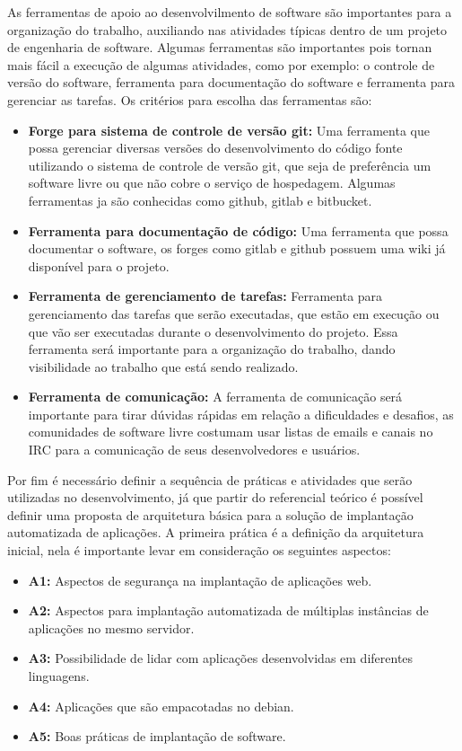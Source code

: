 
As ferramentas de apoio ao desenvolvilmento de software são importantes para a
organização do trabalho, auxiliando nas atividades típicas dentro de um projeto
de engenharia de software. Algumas ferramentas são importantes pois tornan mais fácil
a execução de algumas atividades, como por exemplo: o controle de versão do software,
ferramenta para documentação do software e ferramenta para gerenciar as tarefas.
Os critérios para escolha das ferramentas são:

\begin{itemize}
  \item \textbf{Forge para sistema de controle de versão git:} Uma ferramenta que
  possa gerenciar diversas versões do desenvolvimento do código fonte utilizando
  o sistema de controle de versão git, que seja de preferência um software livre
  ou que não cobre o serviço de hospedagem. Algumas ferramentas ja são
  conhecidas como github, gitlab e bitbucket.
  \item \textbf{Ferramenta para documentação de código:} Uma ferramenta que possa
  documentar o software, os forges como gitlab e github possuem uma wiki já disponível
  para o projeto.
  \item \textbf{Ferramenta de gerenciamento de tarefas:} Ferramenta para gerenciamento
  das tarefas que serão executadas, que estão em execução ou que vão ser executadas
  durante o desenvolvimento do projeto. Essa ferramenta será importante para a
  organização do trabalho, dando visibilidade ao trabalho que está sendo realizado.
  \item \textbf{Ferramenta de comunicação:} A ferramenta de comunicação será
  importante para tirar dúvidas rápidas em relação a dificuldades e desafios, as
  comunidades de software livre costumam usar listas de emails e canais no IRC
  para a comunicação de seus desenvolvedores e usuários.
\end{itemize}


Por fim é necessário definir a  sequência de práticas  e atividades que serão
utilizadas no desenvolvimento, já que partir do referencial teórico é possível
definir uma proposta de arquitetura básica para a solução de implantação automatizada
de aplicações. A primeira prática é a definição da arquitetura inicial, nela é importante levar em consideração os
seguintes aspectos:

\begin{itemize}
  \item  \textbf{A1:} Aspectos de segurança na implantação de aplicações web.
  \item  \textbf{A2:} Aspectos para implantação automatizada de múltiplas instâncias de
   aplicações no mesmo servidor.
  \item  \textbf{A3:} Possibilidade de lidar com aplicações desenvolvidas em
  diferentes linguagens.
  \item  \textbf{A4:} Aplicações que são empacotadas no debian.
  \item  \textbf{A5:} Boas práticas de implantação de software.
\end{itemize}

